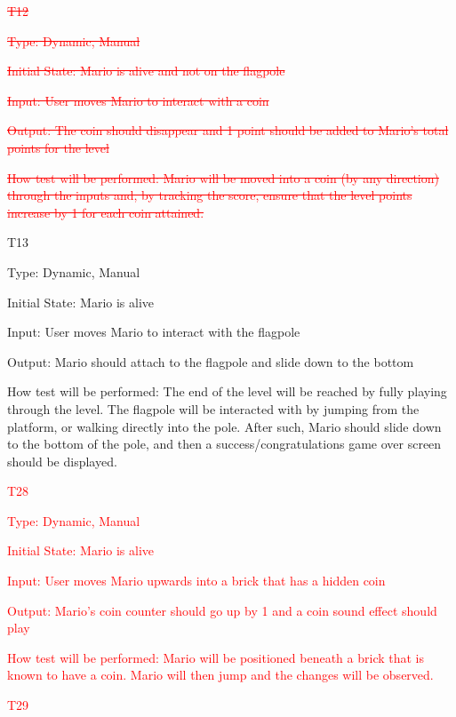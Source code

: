 \documentclass[12pt, titlepage]{article}
\begin{document}
\begin{enumerate}
\item{\textcolor{red}{\st{T12}}}


\textcolor{red}{\st{Type: Dynamic, Manual}}

\textcolor{red}{\st{Initial State: Mario is alive and not on the flagpole}}

\textcolor{red}{\st{Input: User moves Mario to interact with a coin}}

\textcolor{red}{\st{Output: The coin should disappear and 1 point should be added to Mario's total points for the level}}

\textcolor{red}{\st{How test will be performed: Mario will be moved into a coin (by any direction) through the inputs and, by tracking the score, ensure that the level points increase by 1 for each coin attained.
}}

\item{T13\\}

Type: Dynamic, Manual

Initial State: Mario is alive

Input: User moves Mario to interact with the flagpole

Output: Mario should attach to the flagpole and slide down to the bottom

How test will be performed: The end of the level will be reached by fully playing through the level. The flagpole will be interacted with by jumping from the platform, or walking directly into the pole. After such, Mario should slide down to the bottom of the pole, and then a success/congratulations game over screen should be displayed.

\textcolor{red}{\item{T28\\}}

\textcolor{red}{Type: Dynamic, Manual}

\textcolor{red}{Initial State: Mario is alive}

\textcolor{red}{Input: User moves Mario upwards into a brick that has a hidden coin}

\textcolor{red}{Output: Mario's coin counter should go up by 1 and a coin sound effect should play}

\textcolor{red}{How test will be performed: Mario will be positioned beneath a brick that is known to have a coin. Mario will then jump and the changes will be observed.}


\textcolor{red}{\item{T29\\}}


\end{enumerate}
\end{document}
